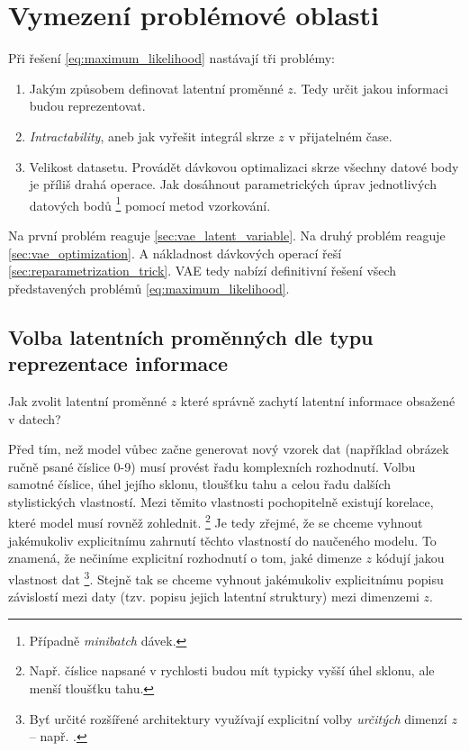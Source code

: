 \section{Vymezení problémové oblasti}
Při řešení \autoref{eq:maximum_likelihood} nastávají tři problémy:
\begin{enumerate}
    \item Jakým způsobem definovat latentní proměnné $z$. Tedy určit jakou informaci budou reprezentovat.
    \item \emph{Intractability}, aneb jak vyřešit integrál skrze $z$ v přijatelném čase. \cite[Sekce 2.1.]{Kingma2014}
    \item Velikost datasetu. Provádět dávkovou optimalizaci skrze všechny datové body je příliš drahá operace. Jak dosáhnout parametrických úprav jednotlivých datových bodů \footnote{Případně \emph{minibatch} dávek.} pomocí metod vzorkování.
\end{enumerate}

Na první problém reaguje \autoref{sec:vae_latent_variable}.
Na druhý problém reaguje \autoref{sec:vae_optimization}. A nákladnost dávkových operací řeší \autoref{sec:reparametrization_trick}.
VAE tedy nabízí definitivní řešení všech představených problémů \autoref{eq:maximum_likelihood}. 

\subsection{Volba latentních proměnných dle typu reprezentace informace}
\label{sec:vae_latent_variable}
Jak zvolit latentní proměnné $z$ které správně zachytí latentní informace obsažené v datech?

Před tím, než model vůbec začne generovat nový vzorek dat (například obrázek ručně psané číslice 0-9) musí provést řadu komplexních rozhodnutí.
Volbu samotné číslice, úhel jejího sklonu, tloušťku tahu a celou řadu dalších stylistických vlastností.
Mezi těmito vlastnosti pochopitelně existují korelace, které model musí rovněž zohlednit. \footnote{Např. číslice napsané v rychlosti budou mít typicky vyšší úhel sklonu, ale menší tloušťku tahu.}
Je tedy zřejmé, že se chceme vyhnout jakémukoliv explicitnímu zahrnutí těchto vlastností do naučeného modelu.
To znamená, že nečiníme explicitní rozhodnutí o tom, jaké dimenze $z$ kódují jakou vlastnost dat
\footnote{Byť určité rozšířené architektury využívají explicitní volby \emph{určitých} dimenzí $z$ – např. \cite{Kulkarni2015}.}.
Stejně tak se chceme vyhnout jakémukoliv explicitnímu popisu závislostí mezi daty (tzv. popisu jejich latentní struktury) mezi dimenzemi $z$. \cite{Doersch2021}

